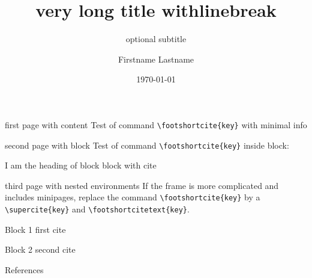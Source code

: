 \documentclass{jdbeamer169}
\author{Firstname Lastname}
\title[short title]{very long title with\newline linebreak} %
\subtitle{optional subtitle}
\institute{Institute for Numerical Mathematics}
\date{\today}
\begin{document}
\frame[plain]{\titlepage}

\begin{frame}{first page with content}
    Test of command \texttt{\textbackslash footshortcite\{key\}} with minimal info
\end{frame}

\begin{frame}{second page with block}
    Test of command \texttt{\textbackslash footshortcite\{key\}} inside block: 
    \begin{block}{I am the heading of block}
	block with cite
    \end{block}
\end{frame}

\begin{frame}{third page with nested environments}
    If the frame is more complicated and includes minipages, replace the command \texttt{\textbackslash footshortcite\{key\}} by 
    a \texttt{\textbackslash supercite\{key\}} and \texttt{\textbackslash footshortcitetext\{key\}}.
    \begin{minipage}[b]{0.4\textwidth}
	\begin{block}{Block 1}
	    first cite\supercite{article01}
	\end{block}
    \end{minipage}
    \hfill
    \begin{minipage}[b]{0.4\textwidth}
	\begin{block}{Block 2}
	    second cite\supercite{article02}
	\end{block}
    \end{minipage}
\end{frame}

\begin{frame}{References}
    \printbibliography
\end{frame}
\end{document}
